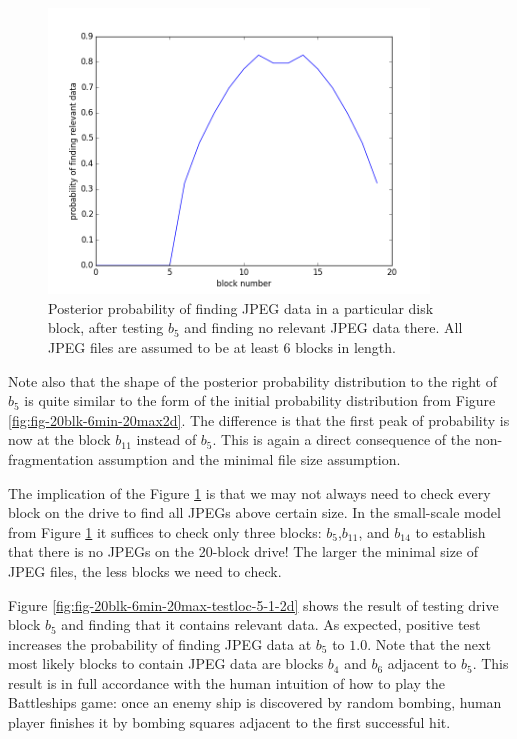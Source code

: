 \documentclass[final,5p,times,twocolumn,authoryear]{elsarticle}
\begin{document}
\begin{figure}
  \centerline{\includegraphics[width=0.9\textwidth]{figures/fig-20blk-6min-20max-testloc-5-0-2d}}
  \caption{Posterior probability of finding JPEG data in a particular disk block, after testing $b_5$ and finding no relevant JPEG data there. All JPEG files are assumed to be at least 6 blocks in length.}
  \label{fig:fig-20blk-6min-20max-testloc-5-0-2d}
\end{figure}

Note also that the shape of the posterior probability distribution to the right of $b_5$ is quite similar to the form of the initial probability distribution from Figure \ref{fig:fig-20blk-6min-20max2d}. The difference is that the first peak of probability is now at the block $b_{11}$ instead of $b_{5}$. This is again a direct consequence of the non-fragmentation assumption and the minimal file size assumption. 

The implication of the Figure \ref{fig:fig-20blk-6min-20max-testloc-5-0-2d} is that we may not always need to check every block on the drive to find all JPEGs above certain size. In the small-scale model from Figure \ref{fig:fig-20blk-6min-20max-testloc-5-0-2d} it suffices to check only three blocks: $b_5$,$b_{11}$, and $b_{14}$ to establish that there is no JPEGs on the 20-block drive! The larger the minimal size of JPEG files, the less blocks we need to check.

Figure \ref{fig:fig-20blk-6min-20max-testloc-5-1-2d} shows the result of testing drive block $b_5$ and finding that it contains relevant data. As expected, positive test increases the probability of finding JPEG data at $b_5$ to $1.0$. Note that the next most likely blocks to contain JPEG data are blocks $b_4$ and $b_6$ adjacent to $b_5$. This result is in full accordance with the human intuition of how to play the Battleships game: once an enemy ship is discovered by random bombing, human player finishes it by bombing squares adjacent to the first successful hit.
\end{document}
